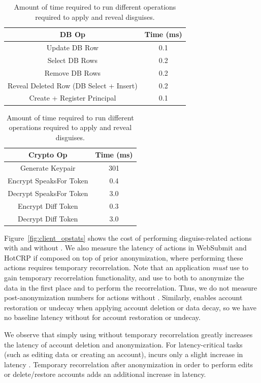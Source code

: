 \begin{table}[h!]
\begin{center}
\begin{tabular}{ c c }
\textbf{DB Op} & \textbf{Time (ms)}\\
\hline
Update DB Row & 0.1\\ 
Select DB Rows & 0.2\\
Remove DB Rows & 0.2\\
Reveal Deleted Row (DB Select + Insert) & 0.2 \\
Create + Register Principal & 0.1\\
\end{tabular}
\quad
\begin{tabular}{ c c }
\textbf{Crypto Op} & \textbf{Time (ms)}\\
\hline
Generate Keypair & 301\\
Encrypt SpeaksFor Token & 0.4\\
Decrypt SpeaksFor Token & 3.0\\
Encrypt Diff Token & 0.3\\
Decrypt Diff Token & 3.0\\
\end{tabular}
\end{center}
\caption{Amount of time required to run different operations required to apply and reveal disguises.}
\label{tab:opstats}
\end{table}

%
Figure~\ref{fig:client_opstats} shows the cost of performing disguise-related actions with and
without \sys. We also measure the latency of actions in WebSubmit and HotCRP if composed on top of
prior anonymization, where performing these actions requires temporary recorrelation. Note that an
application \emph{must} use \sys to gain temporary recorrelation functionality, and use \sys to both
to anonymize the data in the first place and to perform the recorrelation. Thus, we do not measure
post-anonymization numbers for actions without \sys. Similarly, \sys enables account restoration or
undecay when applying account deletion or data decay, so we have no baseline latency without \sys
for account restoration or undecay.

We observe that simply using \sys without temporary recorrelation greatly increases the latency of
account deletion and anonymization.  For latency-critical tasks (such as editing data or creating an
account), \sys incurs only a slight increase in latency . Temporary recorrelation
after anonymization in order to perform edits or delete/restore accounts adds an additional
 increase in latency.

